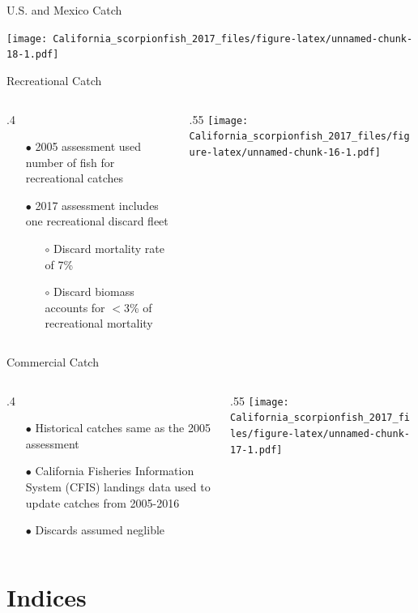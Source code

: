 \documentclass[ignorenonframetext,]{beamer}
\def\begincols{\begin{columns}}
\def\begincol{\begin{column}}
\def\endcol{\end{column}}
\def\endcols{\end{columns}}
\begin{document}
\begin{frame}{U.S. and Mexico Catch}

\texttt{[image: California\_scorpionfish\_2017\_files/figure-latex/unnamed-chunk-18-1.pdf]}

\end{frame}

\begin{frame}{Recreational Catch}

\begincols
 \begincol{.4\textwidth}

\begin{itemize}
\item[$\bullet$] 2005 assessment used number of fish for recreational catches
\item[$\bullet$] 2017 assessment includes one recreational discard fleet
\begin{itemize}
\item[$\circ$] Discard mortality rate of 7\%
\item[$\circ$] Discard biomass accounts for  $<$3\% of recreational mortality
\end{itemize}
\end{itemize}

\endcol
 \begincol{.55\textwidth}
\texttt{[image: California\_scorpionfish\_2017\_files/figure-latex/unnamed-chunk-16-1.pdf]}\\
\endcol
\endcols

\end{frame}

\begin{frame}{Commercial Catch}

\begincols
 \begincol{.4\textwidth}

\begin{itemize}
  \item[$\bullet$] Historical catches same as the 2005 assessment
  \item[$\bullet$] California Fisheries Information System (CFIS) landings data used to update catches from 2005-2016 
  \item[$\bullet$] Discards assumed neglible
\end{itemize}

\endcol
 \begincol{.55\textwidth}
\texttt{[image: California\_scorpionfish\_2017\_files/figure-latex/unnamed-chunk-17-1.pdf]}
\endcol
\endcols

\end{frame}

\section{Indices}\label{indices}
\end{document}
